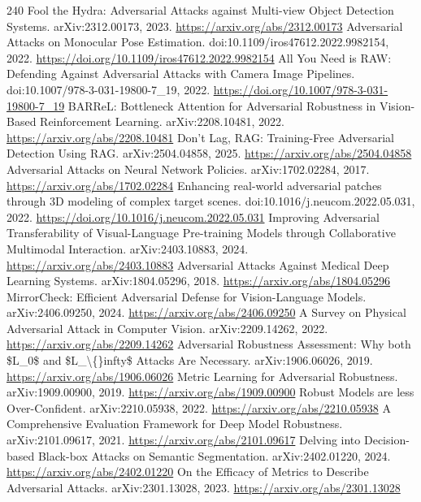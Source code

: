 \documentclass[11pt]{article}
\begin{document}
\begin{thebibliography}{240}
 Fool the Hydra: Adversarial Attacks against Multi-view Object Detection Systems. arXiv:2312.00173, 2023. \url{https://arxiv.org/abs/2312.00173}
 Adversarial Attacks on Monocular Pose Estimation. doi:10.1109/iros47612.2022.9982154, 2022. \url{https://doi.org/10.1109/iros47612.2022.9982154}
 All You Need is RAW: Defending Against Adversarial Attacks with Camera Image Pipelines. doi:10.1007/978-3-031-19800-7\_19, 2022. \url{https://doi.org/10.1007/978-3-031-19800-7_19}
 BARReL: Bottleneck Attention for Adversarial Robustness in Vision-Based Reinforcement Learning. arXiv:2208.10481, 2022. \url{https://arxiv.org/abs/2208.10481}
 Don't Lag, RAG: Training-Free Adversarial Detection Using RAG. arXiv:2504.04858, 2025. \url{https://arxiv.org/abs/2504.04858}
 Adversarial Attacks on Neural Network Policies. arXiv:1702.02284, 2017. \url{https://arxiv.org/abs/1702.02284}
 Enhancing real-world adversarial patches through 3D modeling of complex target scenes. doi:10.1016/j.neucom.2022.05.031, 2022. \url{https://doi.org/10.1016/j.neucom.2022.05.031}
 Improving Adversarial Transferability of Visual-Language Pre-training Models through Collaborative Multimodal Interaction. arXiv:2403.10883, 2024. \url{https://arxiv.org/abs/2403.10883}
 Adversarial Attacks Against Medical Deep Learning Systems. arXiv:1804.05296, 2018. \url{https://arxiv.org/abs/1804.05296}
 MirrorCheck: Efficient Adversarial Defense for Vision-Language Models. arXiv:2406.09250, 2024. \url{https://arxiv.org/abs/2406.09250}
 A Survey on Physical Adversarial Attack in Computer Vision. arXiv:2209.14262, 2022. \url{https://arxiv.org/abs/2209.14262}
 Adversarial Robustness Assessment: Why both \$L\_0\$ and \$L\_\textbackslash\{\}infty\$ Attacks Are Necessary. arXiv:1906.06026, 2019. \url{https://arxiv.org/abs/1906.06026}
 Metric Learning for Adversarial Robustness. arXiv:1909.00900, 2019. \url{https://arxiv.org/abs/1909.00900}
 Robust Models are less Over-Confident. arXiv:2210.05938, 2022. \url{https://arxiv.org/abs/2210.05938}
 A Comprehensive Evaluation Framework for Deep Model Robustness. arXiv:2101.09617, 2021. \url{https://arxiv.org/abs/2101.09617}
 Delving into Decision-based Black-box Attacks on Semantic Segmentation. arXiv:2402.01220, 2024. \url{https://arxiv.org/abs/2402.01220}
 On the Efficacy of Metrics to Describe Adversarial Attacks. arXiv:2301.13028, 2023. \url{https://arxiv.org/abs/2301.13028}

\end{thebibliography}
\end{document}
